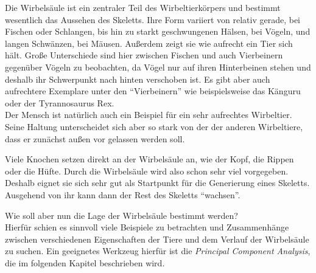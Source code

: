 Die Wirbelsäule ist ein zentraler Teil des Wirbeltierkörpers und bestimmt wesentlich das Aussehen des Skeletts.
Ihre Form variiert von relativ gerade, \zb bei Fischen oder Schlangen, bis hin zu starkt geschwungenen Hälsen, \va bei Vögeln, und langen Schwänzen, \zb bei Mäusen. Außerdem zeigt sie wie aufrecht ein Tier sich hält. Große Unterschiede sind hier zwischen Fischen und auch Vierbeinern gegenüber Vögeln zu beobachten, da Vögel nur auf ihren Hinterbeinen stehen und deshalb ihr Schwerpunkt nach hinten verschoben ist. Es gibt aber auch aufrechtere Exemplare unter den "`Vierbeinern"' wie beispielsweise das Känguru oder der Tyrannosaurus Rex. \\
Der Mensch ist natürlich auch ein Beispiel für ein sehr aufrechtes Wirbeltier. Seine Haltung unterscheidet sich aber so stark von der der anderen Wirbeltiere, dass er zunächst außen vor gelassen werden soll.

Viele Knochen setzen direkt an der Wirbelsäule an, wie \zb der Kopf, die Rippen oder die Hüfte. Durch die Wirbelsäule wird also schon sehr viel vorgegeben.
Deshalb eignet sie sich sehr gut als Startpunkt für die Generierung eines Skeletts. Ausgehend von ihr kann dann der Rest des Skeletts "`wachsen"'.

Wie soll aber nun die Lage der Wirbelsäule bestimmt werden?\\
Hierfür schien es sinnvoll viele Beispiele zu betrachten und Zusammenhänge zwischen verschiedenen Eigenschaften der Tiere und dem Verlauf der Wirbelsäule zu suchen.
Ein geeignetes Werkzeug hierfür ist die \emph{Principal Component Analysis}, die im folgenden Kapitel beschrieben wird.


